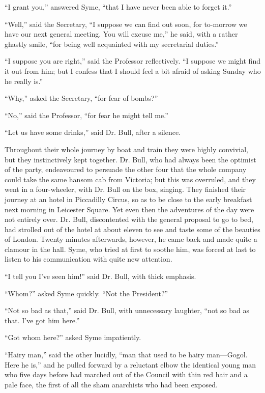 \documentclass{book}
\begin{document}
“I grant you,” answered Syme, “that I have never been able to forget it.”

“Well,” said the Secretary, “I suppose we can find out soon, for to-morrow we have our next general meeting. You will excuse me,” he said, with a rather ghastly smile, “for being well acquainted with my secretarial duties.”

“I suppose you are right,” said the Professor reflectively. “I suppose we might find it out from him; but I confess that I should feel a bit afraid of asking Sunday who he really is.”

“Why,” asked the Secretary, “for fear of bombs?”

“No,” said the Professor, “for fear he might tell me.”

“Let us have some drinks,” said Dr. Bull, after a silence.

Throughout their whole journey by boat and train they were highly convivial, but they instinctively kept together. Dr. Bull, who had always been the optimist of the party, endeavoured to persuade the other four that the whole company could take the same hansom cab from Victoria; but this was overruled, and they went in a four-wheeler, with Dr. Bull on the box, singing. They finished their journey at an hotel in Piccadilly Circus, so as to be close to the early breakfast next morning in Leicester Square. Yet even then the adventures of the day were not entirely over. Dr. Bull, discontented with the general proposal to go to bed, had strolled out of the hotel at about eleven to see and taste some of the beauties of London. Twenty minutes afterwards, however, he came back and made quite a clamour in the hall. Syme, who tried at first to soothe him, was forced at last to listen to his communication with quite new attention.

“I tell you I’ve seen him!” said Dr. Bull, with thick emphasis.

“Whom?” asked Syme quickly. “Not the President?”

“Not so bad as that,” said Dr. Bull, with unnecessary laughter, “not so bad as that. I’ve got him here.”

“Got whom here?” asked Syme impatiently.

“Hairy man,” said the other lucidly, “man that used to be hairy man—Gogol. Here he is,” and he pulled forward by a reluctant elbow the identical young man who five days before had marched out of the Council with thin red hair and a pale face, the first of all the sham anarchists who had been exposed.
\end{document}
